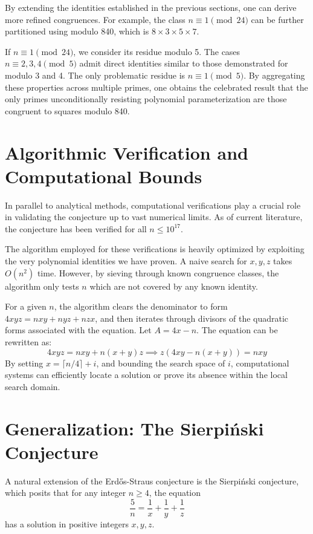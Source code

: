 \documentclass[12pt,a4paper]{article}
\begin{document}
By extending the identities established in the previous sections, one can derive more refined congruences. For example, the class $n \equiv 1 \pmod{24}$ can be further partitioned using modulo 840, which is $8 \times 3 \times 5 \times 7$.

If $n \equiv 1 \pmod{24}$, we consider its residue modulo 5. The cases $n \equiv 2, 3, 4 \pmod 5$ admit direct identities similar to those demonstrated for modulo 3 and 4. The only problematic residue is $n \equiv 1 \pmod 5$. By aggregating these properties across multiple primes, one obtains the celebrated result that the only primes unconditionally resisting polynomial parameterization are those congruent to squares modulo 840.

\newpage
\section{Algorithmic Verification and Computational Bounds}

In parallel to analytical methods, computational verifications play a crucial role in validating the conjecture up to vast numerical limits. As of current literature, the conjecture has been verified for all $n \le 10^{17}$.

The algorithm employed for these verifications is heavily optimized by exploiting the very polynomial identities we have proven. A naive search for $x, y, z$ takes $O(n^2)$ time. However, by sieving through known congruence classes, the algorithm only tests $n$ which are not covered by any known identity.

For a given $n$, the algorithm clears the denominator to form $4xyz = nxy + nyz + nzx$, and then iterates through divisors of the quadratic forms associated with the equation. Let $A = 4x - n$. The equation can be rewritten as:
\begin{equation}
4xyz = nxy + n(x+y)z \implies z(4xy - n(x+y)) = nxy
\end{equation}
By setting $x = \lceil n/4 \rceil + i$, and bounding the search space of $i$, computational systems can efficiently locate a solution or prove its absence within the local search domain.

\newpage
\section{Generalization: The Sierpiński Conjecture}

A natural extension of the Erd\H{o}s-Straus conjecture is the Sierpiński conjecture, which posits that for any integer $n \ge 4$, the equation
\begin{equation}
\frac{5}{n} = \frac{1}{x} + \frac{1}{y} + \frac{1}{z}
\end{equation}
has a solution in positive integers $x, y, z$.
\end{document}
